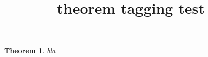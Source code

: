 \documentclass{article}
\title{theorem tagging test}
\newtheorem{theorem}{Theorem}
\begin{document}
\begin{theorem}
bla
\end{theorem}
\end{document}
